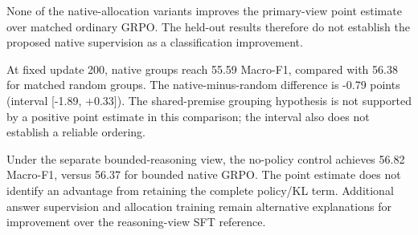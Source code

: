None of the native-allocation variants improves the primary-view point estimate over matched ordinary GRPO. The held-out results therefore do not establish the proposed native supervision as a classification improvement.

At fixed update 200, native groups reach 55.59 Macro-F1, compared with 56.38 for matched random groups. The native-minus-random difference is -0.79 points (interval [-1.89, +0.33]). The shared-premise grouping hypothesis is not supported by a positive point estimate in this comparison; the interval also does not establish a reliable ordering.

Under the separate bounded-reasoning view, the no-policy control achieves 56.82 Macro-F1, versus 56.37 for bounded native GRPO. The point estimate does not identify an advantage from retaining the complete policy/KL term. Additional answer supervision and allocation training remain alternative explanations for improvement over the reasoning-view SFT reference.
